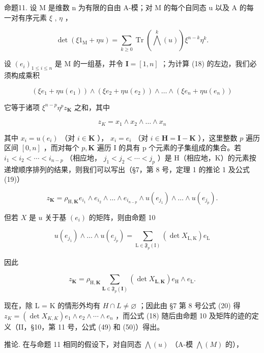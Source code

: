 命题11. 设 M 是维数 n 为有限的自由 A-模；对 M 的每个自同态 u 以及 A 的每一对有序元素 \(\xi\) , \(\eta\) ，

\[
\det (\xi 1 _ {\mathrm{M}} + \eta u) = \sum_ {k \geqslant 0} \operatorname{Tr} \left(\bigwedge^ {k} (u)\right) \xi^ {n - k} \eta^ {k}.\tag{18}
\]

设 \((e_i)_{1\leqslant i\leqslant n}\) 是 M 的一组基，并令 \(\mathbf{I} = [1,n]\) ；为计算 (18) 的左边，我们必须构成乘积

\[
\left(\xi e _ {1} + \eta u (e _ {1})\right) \wedge \left(\xi e _ {2} + \eta u (e _ {2})\right) \wedge \dots \wedge \left(\xi e _ {n} + \eta u (e _ {n})\right)
\]

它等于诸项 \(\xi^{n - p}\eta^{p}z_{\mathbf{K}}\) 之和，其中

\[
z _ {K} = x _ {1} \wedge x _ {2} \wedge \dots \wedge x _ {n}
\]

其中 \(x_{i} = u(e_{i})\) （对 \(i \in \mathbf{K}\) ）， \(x_{i} = e_{i}\) （对 \(i \in \mathbf{H} = \mathbf{I} - \mathbf{K}\) ），这里整数 \(p\) 遍历区间 \([0, n]\) ，而对每个 \(p, \mathbf{K}\) 遍历 I 的具有 p 个元素的子集组成的集合。若 \(i_{1} < i_{2} < \cdots < i_{n-p}\) （相应地， \(j_{1} < j_{2} < \cdots < j_{p}\) ）是 H（相应地，K）的元素按递增顺序排列的结果，则我们可以写出（§7，第 8 号，定理 1 的推论 1 及公式 (19)）

\[
z _ {\mathbf {K}} = \rho_ {\mathrm{H}, \mathbf {K}} e _ {i _ {1}} \wedge e _ {i _ {2}} \wedge \dots \wedge e _ {i _ {n - p}} \wedge u (e _ {j _ {1}}) \wedge \dots \wedge u (e _ {j _ {p}}).
\]

但若 \(X\) 是 \(u\) 关于基 \((e_i)\) 的矩阵，则由命题 10

\[
u (e _ {j _ {1}}) \wedge \dots \wedge u (e _ {j _ {p}}) = \sum_ {\mathrm{L} \in \mathfrak {F} _ {p} (\mathrm{I})} (\det X _ {\mathrm{L}, \mathrm{K}}) e _ {\mathrm{L}}
\]

因此

\[
z _ {\mathbf {K}} = \rho_ {\mathrm{H}, \mathbf {K}} \sum_ {\mathbf {L} \in \mathfrak {F} _ {p} (\mathbf {I})} (\det X _ {\mathbf {L}, \mathbf {K}}) e _ {\mathrm{H}} \wedge e _ {\mathrm{L}}.
\]

现在，除 L = K 的情形外均有 \(H \cap L \neq \varnothing\) ；因此由 §7 第 8 号公式 (20) 得 \(z_{K} = (\det X_{K,K})e_{1} \wedge e_{2} \wedge \cdots \wedge e_{n}\) ，而公式 (18) 随后由命题 10 及矩阵的迹的定义（II，§10，第 11 号，公式 (49) 和 (50)）得出。

推论. 在与命题 11 相同的假设下，对自同态 \(\bigwedge(u)\) （A-模 \(\bigwedge(M)\) 的），

